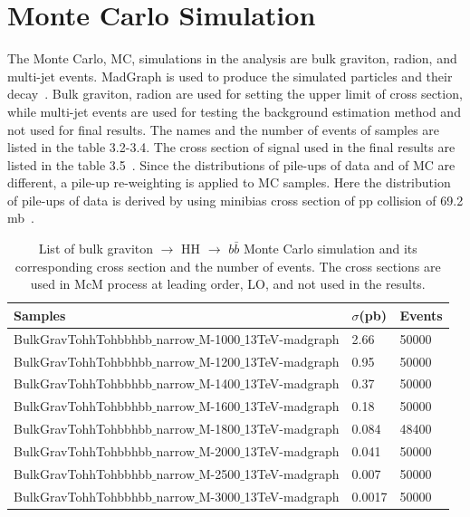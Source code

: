 \section{Monte Carlo Simulation} \label{Monte Carlo Simulation}	
The Monte Carlo, MC, simulations in the analysis are bulk graviton, radion, and multi-jet events. MadGraph is used to produce the simulated particles and their decay~\citep{Alwall2011}. Bulk graviton, radion are used for setting the upper limit of cross section, while multi-jet events are used for testing the background estimation method and not used for final results. The names and the number of events of samples are listed in the table 3.2-3.4. The cross section of signal used in the final results are listed in the table 3.5~\citep{WED_BG_13TeV,WED_radion_13TeV,WED_BGHHDecay_13TeV,WED_radionHHDecay_13TeV}. Since the distributions of pile-ups of data and of MC are different, a pile-up re-weighting is applied to MC samples. Here the distribution of pile-ups of data is derived by using minibias cross section of pp collision of 69.2 mb~\citep{Aaboud:2016mmw}.%
\begin{table}[h!]
  \begin{center}
    \begin{tabular}{l|l|l}
    Samples & $\sigma$(pb) & Events \\
    \hline
    BulkGravTohhTohbbhbb$\_$narrow$\_$M-1000$\_$13TeV-madgraph & 2.66 & 50000 \\
    BulkGravTohhTohbbhbb$\_$narrow$\_$M-1200$\_$13TeV-madgraph & 0.95 & 50000 \\
    BulkGravTohhTohbbhbb$\_$narrow$\_$M-1400$\_$13TeV-madgraph & 0.37 & 50000 \\
    BulkGravTohhTohbbhbb$\_$narrow$\_$M-1600$\_$13TeV-madgraph & 0.18 & 50000 \\
    BulkGravTohhTohbbhbb$\_$narrow$\_$M-1800$\_$13TeV-madgraph & 0.084 & 48400 \\
    BulkGravTohhTohbbhbb$\_$narrow$\_$M-2000$\_$13TeV-madgraph & 0.041 & 50000 \\
    BulkGravTohhTohbbhbb$\_$narrow$\_$M-2500$\_$13TeV-madgraph & 0.007 & 50000 \\
    BulkGravTohhTohbbhbb$\_$narrow$\_$M-3000$\_$13TeV-madgraph & 0.0017 & 50000 \\
    	\hline
    \end{tabular}
  \end{center}

  \caption{List of bulk graviton $\rightarrow$ HH $\rightarrow$ $b\bar{b}$ Monte Carlo simulation and its corresponding cross section and the number of events. The cross sections are used in McM process at leading order, LO, and not used in the results.}
\end{table} 

